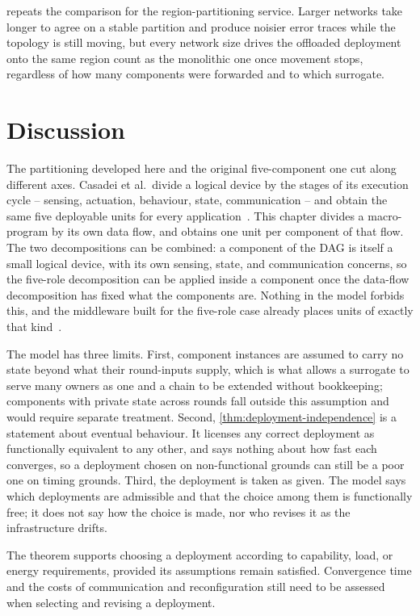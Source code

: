  repeats the comparison for the region-partitioning service.
%
Larger networks take longer to agree on a stable partition and produce noisier error traces while the topology is still moving,
but every network size drives the offloaded deployment onto the same region count as the monolithic one once movement stops,
regardless of how many components were forwarded and to which surrogate.

\section{Discussion}
\label{sec:pulverization-discussion}

The partitioning developed here and the original five-component one cut along different axes.
Casadei et al.\ divide a logical device by the stages of its execution cycle -- sensing, actuation, behaviour, state, communication -- and obtain the same five deployable units for every application~\cite{DBLP:journals/fi/CasadeiPPVW20}.
This chapter divides a macro-program by its own data flow, and obtains one unit per component of that flow.
The two decompositions can be combined:
a component of the \ac{DAG} is itself a small logical device, with its own sensing, state, and communication concerns,
so the five-role decomposition can be applied inside a component once the data-flow decomposition has fixed what the components are.
Nothing in the model forbids this, and the middleware built for the five-role case already places units of exactly that kind~\cite{DBLP:journals/fgcs/FarabegoliPCV24}.

The model has three limits.
First, component instances are assumed to carry no state beyond what their round-inputs supply,
which is what allows a surrogate to serve many owners as one and a chain to be extended without bookkeeping;
components with private state across rounds fall outside this assumption and would require separate treatment.
Second, \cref{thm:deployment-independence} is a statement about eventual behaviour.
It licenses any correct deployment as functionally equivalent to any other, and says nothing about how fast each converges,
so a deployment chosen on non-functional grounds can still be a poor one on timing grounds.
Third, the deployment is taken as given.
The model says which deployments are admissible and that the choice among them is functionally free;
it does not say how the choice is made, nor who revises it as the infrastructure drifts.


The theorem supports choosing a deployment according to capability, load, or energy requirements,
provided its assumptions remain satisfied.
Convergence time and the costs of communication and reconfiguration still need to be assessed when selecting and revising a deployment.
\clearpage
